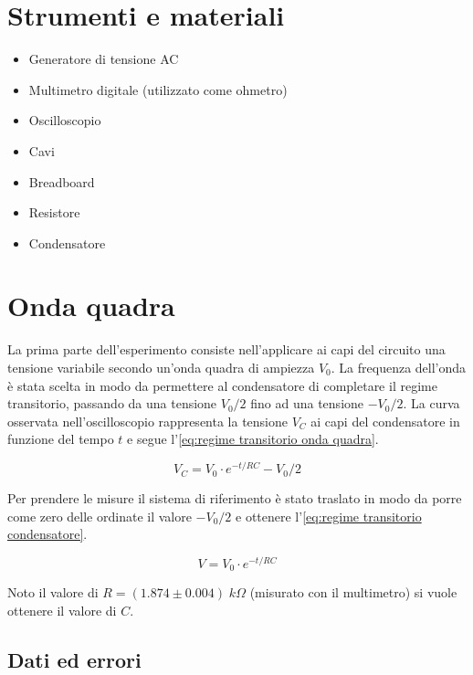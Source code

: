 \documentclass[11pt, a4paper]{article}
\numberwithin{equation}{section} %
\begin{document}
\section{Strumenti e materiali}

\begin{itemize}
    \item Generatore di tensione AC
    \item Multimetro digitale (utilizzato come ohmetro)
    \item Oscilloscopio
    \item Cavi
    \item Breadboard
    \item Resistore
    \item Condensatore
\end{itemize}

\section{Onda quadra}

La prima parte dell'esperimento consiste nell'applicare ai capi del circuito una tensione variabile secondo un'onda quadra di ampiezza \(V_{0}\). La frequenza dell'onda è stata scelta in modo da permettere al condensatore di completare il regime transitorio, passando da una tensione \(V_{0}/2\) fino ad una tensione \(- V_{0}/2\). La curva osservata nell'oscilloscopio rappresenta la tensione \(V_{C}\) ai capi del condensatore in funzione del tempo \(t\) e segue l'\autoref{eq:regime transitorio onda quadra}.

\begin{equation} \label{eq:regime transitorio onda quadra}
    V_{C} = V_{0} \cdot e^{-t/RC} - V_{0}/2
\end{equation}

Per prendere le misure il sistema di riferimento è stato traslato in modo da porre come zero delle ordinate il valore \(- V_{0}/2\) e ottenere l'\autoref{eq:regime transitorio condensatore}.

\begin{equation} \label{eq:regime transitorio condensatore}
    V = V_{0} \cdot e^{-t/RC}
\end{equation}

Noto il valore di \(R = (1.874 \pm 0.004) \; \unit{k\Omega}\) (misurato con il multimetro) si vuole ottenere il valore di \(C\).

\subsection{Dati ed errori}
\end{document}
